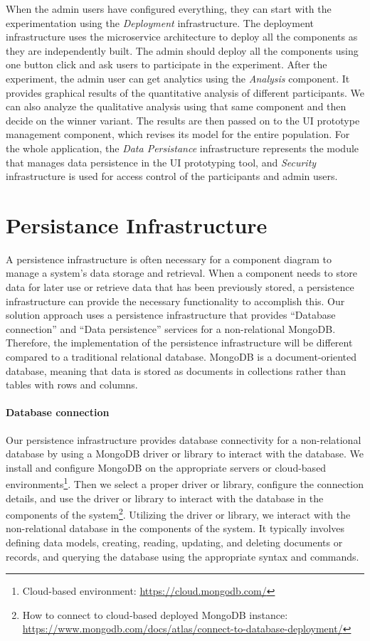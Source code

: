 When the admin users have configured everything, they can start with the experimentation using the \textit{Deployment} infrastructure. 
The deployment infrastructure uses the microservice architecture to deploy all the components as they are independently built. 
The admin should deploy all the components using one button click and ask users to participate in the experiment. 
After the experiment, the admin user can get analytics using the \textit{Analysis} component. 
It provides graphical results of the quantitative analysis of different participants. 
We can also analyze the qualitative analysis using that same component and then decide on the winner variant. 
The results are then passed on to the UI prototype management component, which revises its model for the entire population.  
For the whole application, the \textit{Data Persistance} infrastructure represents the module that manages data persistence in the UI prototyping tool, and \textit{Security} infrastructure is used for access control of the participants and admin users.

\clearpage
\section{Persistance Infrastructure}
\label{sc:section:persistance}
A persistence infrastructure is often necessary for a component diagram to manage a system's data storage and retrieval. 
When a component needs to store data for later use or retrieve data that has been previously stored, a persistence infrastructure can provide the necessary functionality to accomplish this.
Our solution approach uses a persistence infrastructure that provides ``Database connection'' and ``Data persistence'' services for a non-relational MongoDB.
Therefore, the implementation of the persistence infrastructure will be different compared to a traditional relational database. 
MongoDB is a document-oriented database, meaning that data is stored as documents in collections rather than tables with rows and columns.

\paragraph{Database connection}
Our persistence infrastructure provides database connectivity for a non-relational database by using a MongoDB driver or library to interact with the database. 
We install and configure MongoDB on the appropriate servers or cloud-based environments\footnote{Cloud-based environment: \url{https://cloud.mongodb.com/}}.
Then we select a proper driver or library, configure the connection details, and use the driver or library to interact with the database in the components of the system\footnote{How to connect to cloud-based deployed MongoDB instance: \url{https://www.mongodb.com/docs/atlas/connect-to-database-deployment/}}.
Utilizing the driver or library, we interact with the non-relational database in the components of the system. It typically involves defining data models, creating, reading, updating, and deleting documents or records, and querying the database using the appropriate syntax and commands.

